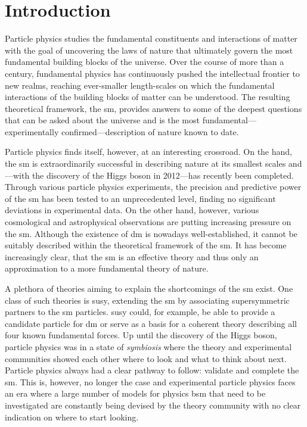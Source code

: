
\chapter*{Introduction}
\ifpdf
    \graphicspath{{Chapter1/Figs/Raster/}{Chapter1/Figs/PDF/}{Chapter1/Figs/}}
\else
    \graphicspath{{Chapter1/Figs/Vector/}{Chapter1/Figs/}}
\fi

Particle physics studies the fundamental constituents and interactions of matter with the goal of uncovering the laws of nature that ultimately govern the most fundamental building blocks of the universe. Over the course of more than a century, fundamental physics has continuously pushed the intellectual frontier to new realms, reaching ever-smaller length-scales on which the fundamental interactions of the building blocks of matter can be understood. The resulting theoretical framework, the \gls{sm}, provides answers to some of the deepest questions that can be asked about the universe and is the most fundamental---experimentally confirmed---description of nature known to date. 

Particle physics finds itself, however, at an interesting crossroad. On the hand, the \gls{sm} is extraordinarily successful in describing nature at its smallest scales and---with the discovery of the Higgs boson in 2012---has recently been completed. Through various particle physics experiments, the precision and predictive power of the \gls{sm} has been tested to an unprecedented level, finding no significant deviations in experimental data. On the other hand, however, various cosmological and astrophysical observations are putting increasing pressure on the \gls{sm}. Although the existence of \gls{dm} is nowadays well-established, it cannot be suitably described within the theoretical framework of the \gls{sm}. It has become increasingly clear, that the \gls{sm} is an effective theory and thus only an approximation to a more fundamental theory of nature.

A plethora of theories aiming to explain the shortcomings of the \gls{sm} exist. One class of such theories is \gls{susy}, extending the \gls{sm} by associating supersymmetric partners to the \gls{sm} particles. \gls{susy} could, for example, be able to provide a candidate particle for \gls{dm} or serve as a basis for a coherent theory describing all four known fundamental forces. Up until the discovery of the Higgs boson, particle physics was in a state of \textit{symbiosis} where the theory and experimental communities showed each other where to look and what to think about next. Particle physics always had a clear pathway to follow: validate and complete the \gls{sm}. This is, however, no longer the case and experimental particle physics faces an era where a large number of models for physics \gls{bsm} that need to be investigated are constantly being devised by the theory community with no clear indication on where to start looking. 

